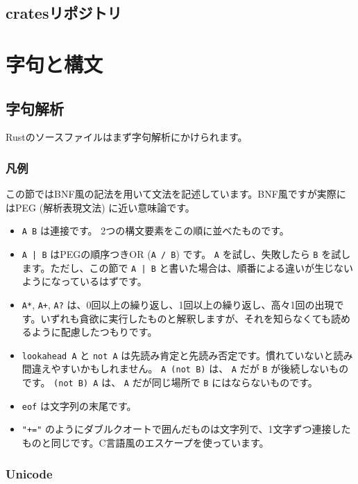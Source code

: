 \documentclass[dvipdfmx,uplatex,papersize,a4paper,10pt]{jsbook}
\theoremstyle{definition}
\begin{document}
\section{cratesリポジトリ}



\chapter{字句と構文}

\section{字句解析}

Rustのソースファイルはまず字句解析にかけられます。

\subsection{凡例}

この節ではBNF風の記法を用いて文法を記述しています。BNF風ですが実際にはPEG (解析表現文法) に近い意味論です。

\begin{itemize}
  \item \verb|A B| は連接です。 2つの構文要素をこの順に並べたものです。
  \item \verb$A | B$ はPEGの順序つきOR (\verb|A / B|) です。 \verb|A| を試し、失敗したら \verb|B| を試します。ただし、この節で \verb$A | B$ と書いた場合は、順番による違いが生じないようになっているはずです。
  \item \verb|A*|, \verb|A+|, \verb|A?| は、0回以上の繰り返し、1回以上の繰り返し、高々1回の出現です。いずれも貪欲に実行したものと解釈しますが、それを知らなくても読めるように配慮したつもりです。
  \item \verb|lookahead A| と \verb|not A| は先読み肯定と先読み否定です。慣れていないと読み間違えやすいかもしれません。 \verb|A (not B)| は、 \verb|A| だが \verb|B| が後続しないものです。 \verb|(not B) A| は、 \verb|A| だが同じ場所で \verb|B| にはならないものです。
  \item \verb|eof| は文字列の末尾です。
  \item \verb|"+="| のようにダブルクオートで囲んだものは文字列で、1文字ずつ連接したものと同じです。C言語風のエスケープを使っています。
\end{itemize}

\subsection{Unicode}
\end{document}
